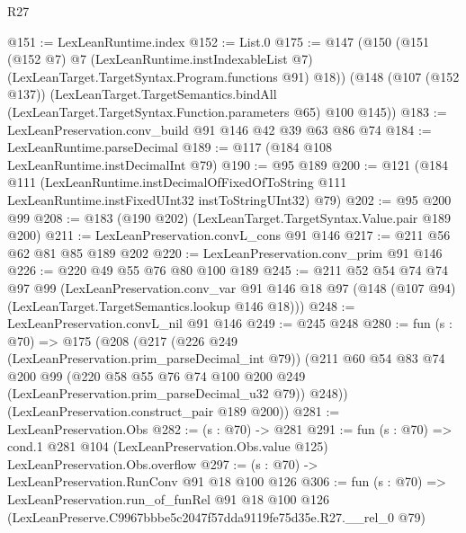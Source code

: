 \begin{lexlean}{R27}
\begin{coremodule}
@151 := LexLeanRuntime.index
@152 := List.{0}
@175 := @147
    (@150
      (@151
        (@152 @7)
        @7
        (LexLeanRuntime.instIndexableList @7)
        (LexLeanTarget.TargetSyntax.Program.functions @91)
        @18))
    (@148
      (@107 (@152 @137))
      (LexLeanTarget.TargetSemantics.bindAll
        (LexLeanTarget.TargetSyntax.Function.parameters @65)
        @100
        @145))
@183 := LexLeanPreservation.conv_build @91 @146 @42 @39 @63 @86 @74
@184 := LexLeanRuntime.parseDecimal
@189 := @117 (@184 @108 LexLeanRuntime.instDecimalInt @79)
@190 := @95 @189
@200 := @121
    (@184
      @111
      (LexLeanRuntime.instDecimalOfFixedOfToString
        @111
        LexLeanRuntime.instFixedUInt32
        instToStringUInt32)
      @79)
@202 := @95 @200 @99
@208 := @183 (@190 @202) (LexLeanTarget.TargetSyntax.Value.pair @189 @200)
@211 := LexLeanPreservation.convL_cons @91 @146
@217 := @211 @56 @62 @81 @85 @189 @202
@220 := LexLeanPreservation.conv_prim @91 @146
@226 := @220 @49 @55 @76 @80 @100 @189
@245 := @211
    @52
    @54
    @74
    @74
    @97
    @99
    (LexLeanPreservation.conv_var
      @91
      @146
      @18
      @97
      (@148 (@107 @94) (LexLeanTarget.TargetSemantics.lookup @146 @18)))
@248 := LexLeanPreservation.convL_nil @91 @146
@249 := @245 @248
@280 := fun (s : @70) =>
  @175
    (@208
      (@217
        (@226 @249 (LexLeanPreservation.prim_parseDecimal_int @79))
        (@211
          @60
          @54
          @83
          @74
          @200
          @99
          (@220 @58 @55 @76 @74 @100 @200 @249 (LexLeanPreservation.prim_parseDecimal_u32 @79))
          @248))
      (LexLeanPreservation.construct_pair @189 @200))
@281 := LexLeanPreservation.Obs
@282 := (s : @70) -> @281
@291 := fun (s : @70) =>
  cond.{1} @281 @104 (LexLeanPreservation.Obs.value @125) LexLeanPreservation.Obs.overflow
@297 := (s : @70) -> LexLeanPreservation.RunConv @91 @18 @100 @126
@306 := fun (s : @70) =>
  LexLeanPreservation.run_of_funRel
    @91
    @18
    @100
    @126
    (LexLeanPreserve.C9967bbbe5c2047f57dda9119fe75d35e.R27.__rel_0 @79)
\end{coremodule}
\end{lexlean}
